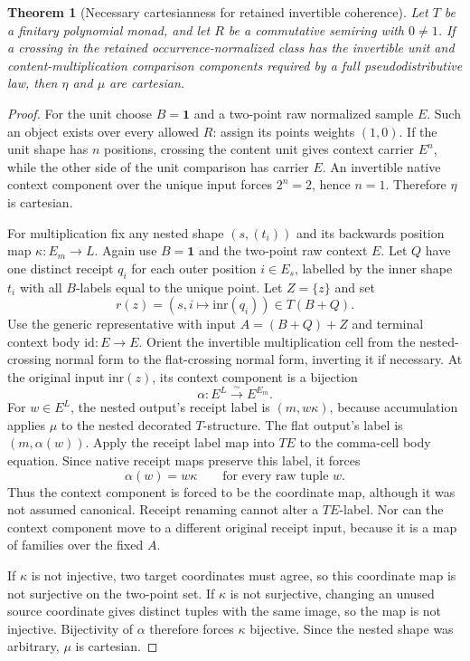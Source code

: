 \documentclass[11pt,a4paper]{article}
\newtheorem{theorem}{Theorem}[section]
\theoremstyle{definition}
\newcommand{\id}{\mathrm{id}}
\newcommand{\one}{\mathbf 1}
\newcommand{\inr}{\mathrm{inr}}
\begin{document}
\begin{theorem}[Necessary cartesianness for retained invertible coherence]
\label{rb:necessity}
Let $T$ be a finitary polynomial monad, and let $R$ be a commutative
semiring with $0\ne1$. If a crossing in the retained occurrence-normalized
class has the invertible unit and content-multiplication comparison
components required by a full pseudodistributive law, then $\eta$ and
$\mu$ are cartesian.
\end{theorem}
\begin{proof}
For the unit choose $B=\one$ and a two-point raw normalized sample $E$.
Such an object exists over every allowed $R$: assign its points weights
$(1,0)$. If the unit shape has $n$ positions, crossing the content unit
gives context carrier $E^n$, while the other side of the unit comparison
has carrier $E$. An invertible native context component over the unique
input forces $2^n=2$, hence $n=1$. Therefore $\eta$ is cartesian.

For multiplication fix any nested shape $(s,(t_i))$ and its backwards
position map $\kappa:E_m\to L$. Again use $B=\one$ and the two-point
raw context $E$. Let $Q$ have one distinct receipt $q_i$ for each outer
position $i\in E_s$, labelled by the inner shape $t_i$ with all $B$-labels
equal to the unique point. Let $Z=\{z\}$ and set
\[
 r(z)=(s,i\mapsto\inr(q_i))\in T(B+Q).
\]
Use the generic representative with input $A=(B+Q)+Z$ and terminal
context body $\id:E\to E$. Orient the invertible multiplication cell from
the nested-crossing normal form to the flat-crossing normal form, inverting
it if necessary. At the original input $\inr(z)$, its context component is
a bijection
\[
 \alpha:E^L\xrightarrow{\sim}E^{E_m}.
\]
For $w\in E^L$, the nested output's receipt label is
$(m,w\kappa)$, because accumulation applies $\mu$ to the nested decorated
$T$-structure. The flat output's label is $(m,\alpha(w))$. Apply the
receipt label map into $TE$ to the comma-cell body equation. Since native
receipt maps preserve this label, it forces
\[
 \alpha(w)=w\kappa\qquad\text{for every raw tuple }w.
\]
Thus the context component is forced to be the coordinate map, although
it was not assumed canonical. Receipt renaming cannot alter a $TE$-label.
Nor can the context component move to a different original receipt input,
because it is a map of families over the fixed $A$.

If $\kappa$ is not injective, two target coordinates must agree, so this
coordinate map is not surjective on the two-point set. If $\kappa$ is not
surjective, changing an unused source coordinate gives distinct tuples
with the same image, so the map is not injective. Bijectivity of $\alpha$
therefore forces $\kappa$ bijective. Since the nested shape was arbitrary,
$\mu$ is cartesian.
\end{proof}
\end{document}
